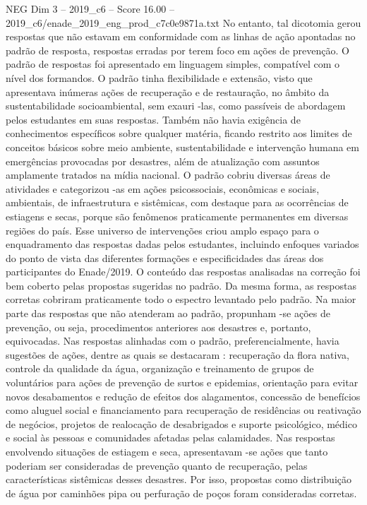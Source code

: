 \begin{textsample}{NEG Dim 3 – 2019\_c6 – Score 16.00 – 2019\_c6/enade\_2019\_eng\_prod\_c7c0e9871a.txt}
No entanto, tal dicotomia gerou respostas que não estavam em conformidade com as linhas de ação apontadas no padrão de resposta, respostas erradas por terem foco em ações de prevenção.
O padrão de respostas foi apresentado em linguagem simples, compatível com o nível dos formandos.
O padrão tinha flexibilidade e extensão, visto que apresentava inúmeras ações de recuperação e de restauração, no âmbito da sustentabilidade socioambiental, sem exauri -las, como passíveis de abordagem pelos estudantes em suas respostas.
Também não havia exigência de conhecimentos específicos sobre qualquer matéria, ficando restrito aos limites de conceitos básicos sobre meio ambiente, sustentabilidade e intervenção humana em emergências provocadas por desastres, além de atualização com assuntos amplamente tratados na mídia nacional.
O padrão cobriu diversas áreas de atividades e categorizou -as em ações psicossociais, econômicas e sociais, ambientais, de infraestrutura e sistêmicas, com destaque para as ocorrências de estiagens e secas, porque são fenômenos praticamente permanentes em diversas regiões do país.
Esse universo de intervenções criou amplo espaço para o enquadramento das respostas dadas pelos estudantes, incluindo enfoques variados do ponto de vista das diferentes formações e especificidades das áreas dos participantes do Enade/2019.
O conteúdo das respostas analisadas na correção foi bem coberto pelas propostas sugeridas no padrão.
Da mesma forma, as respostas corretas cobriram praticamente todo o espectro levantado pelo padrão.
Na maior parte das respostas que não atenderam ao padrão, propunham -se ações de prevenção, ou seja, procedimentos anteriores aos desastres e, portanto, equivocadas.
Nas respostas alinhadas com o padrão, preferencialmente, havia sugestões de ações, dentre as quais se destacaram : recuperação da flora nativa, controle da qualidade da água, organização e treinamento de grupos de voluntários para ações de prevenção de surtos e epidemias, orientação para evitar novos desabamentos e redução de efeitos dos alagamentos, concessão de benefícios como aluguel social e financiamento para recuperação de residências ou reativação de negócios, projetos de realocação de desabrigados e suporte psicológico, médico e social às pessoas e comunidades afetadas pelas calamidades.
Nas respostas envolvendo situações de estiagem e seca, apresentavam -se ações que tanto poderiam ser consideradas de prevenção quanto de recuperação, pelas características sistêmicas desses desastres.
Por isso, propostas como distribuição de água por caminhões pipa ou perfuração de poços foram consideradas corretas.

\end{textsample}

